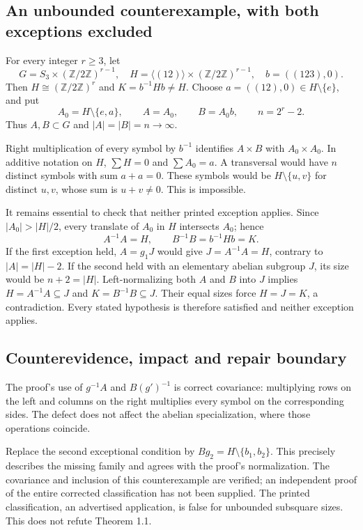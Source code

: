 \documentclass[10pt]{article}
\begin{document}
\subsection*{An unbounded counterexample, with both exceptions excluded}
For every integer \(r\geq3\), let \[G=S_3\times(\mathbb Z/2\mathbb Z)^{r-1},\quad
H=\langle(12)\rangle\times(\mathbb Z/2\mathbb Z)^{r-1},\quad b=((123),0).\] Then \(H\cong(\mathbb Z/2\mathbb Z)^r\) and \(K=b^{-1}Hb\neq H\). Choose \(a=((12),0)\in H\setminus\{e\}\), and put \[A_0=H\setminus\{e,a\},\qquad A=A_0,\qquad B=A_0b,\qquad n=2^r-2.\] Thus \(A,B\subset G\) and \(|A|=|B|=n\to\infty\).\par
Right multiplication of every symbol by \(b^{-1}\) identifies \(A\times B\) with \(A_0\times A_0\). In additive notation on \(H\), \(\sum H=0\) and \(\sum A_0=a\). A transversal would have \(n\) distinct symbols with sum \(a+a=0\). These symbols would be \(H\setminus\{u,v\}\) for distinct \(u,v\), whose sum is \(u+v\neq0\). This is impossible.\par
It remains essential to check that neither printed exception applies. Since \(|A_0|>|H|/2\), every translate of \(A_0\) in \(H\) intersects \(A_0\); hence \[A^{-1}A=H,\qquad B^{-1}B=b^{-1}Hb=K.\] If the first exception held, \(A=g_1J\) would give \(J=A^{-1}A=H\), contrary to \(|A|=|H|-2\). If the second held with an elementary abelian subgroup \(J\), its size would be \(n+2=|H|\). Left-normalizing both \(A\) and \(B\) into \(J\) implies \(H=A^{-1}A\subseteq J\) and \(K=B^{-1}B\subseteq J\). Their equal sizes force \(H=J=K\), a contradiction. Every stated hypothesis is therefore satisfied and neither exception applies.\par
\subsection*{Counterevidence, impact and repair boundary}
The proof’s use of \(g^{-1}A\) and \(B(g')^{-1}\) is correct covariance: multiplying rows on the left and columns on the right multiplies every symbol on the corresponding sides. The defect does not affect the abelian specialization, where those operations coincide.\par
Replace the second exceptional condition by \(Bg_2=H\setminus\{b_1,b_2\}\). This precisely describes the missing family and agrees with the proof’s normalization. The covariance and inclusion of this counterexample are verified; an independent proof of the entire corrected classification has not been supplied. The printed classification, an advertised application, is false for unbounded subsquare sizes. This does not refute Theorem 1.1.\par
\end{document}

